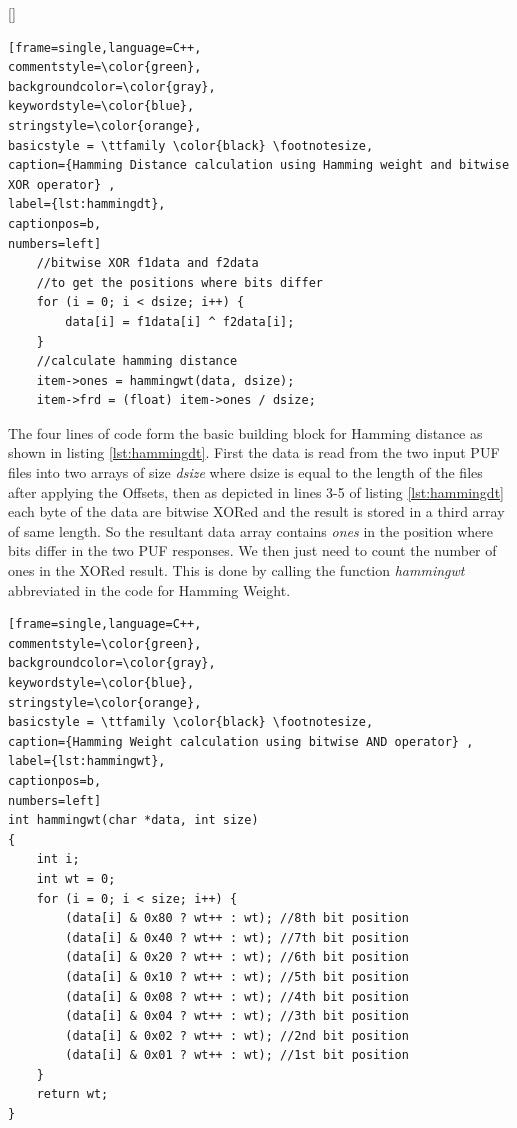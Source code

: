 \begin{center}[]
\begin{minipage}{0.7\textwidth}
\begin{lstlisting}[frame=single,language=C++,
commentstyle=\color{green},
backgroundcolor=\color{gray},
keywordstyle=\color{blue},
stringstyle=\color{orange},
basicstyle = \ttfamily \color{black} \footnotesize,
caption={Hamming Distance calculation using Hamming weight and bitwise XOR operator} ,
label={lst:hammingdt},
captionpos=b,
numbers=left]
    //bitwise XOR f1data and f2data
    //to get the positions where bits differ
    for (i = 0; i < dsize; i++) {
        data[i] = f1data[i] ^ f2data[i];
    }
    //calculate hamming distance
    item->ones = hammingwt(data, dsize);
    item->frd = (float) item->ones / dsize;
\end{lstlisting}
\end{minipage}
\end{center}

The four lines of code form the basic building block for Hamming distance as shown in listing \ref{lst:hammingdt}. First the data is read from the two input PUF files into two arrays of size \emph{dsize} where dsize is equal to the length of the files after applying the Offsets, then as depicted in lines 3-5 of listing \ref{lst:hammingdt} each byte of the data are bitwise XORed and the result is stored in a third array of same length. So the resultant data array contains
\emph{ones} in the position where bits differ in the two PUF responses. We then just need to count the number of ones in the XORed result.
This is done by calling the function \emph{hammingwt} abbreviated in the code for Hamming Weight.\\

\begin{center}
\begin{minipage}{0.7\textwidth}
\begin{lstlisting}[frame=single,language=C++,
commentstyle=\color{green},
backgroundcolor=\color{gray},
keywordstyle=\color{blue},
stringstyle=\color{orange},
basicstyle = \ttfamily \color{black} \footnotesize,
caption={Hamming Weight calculation using bitwise AND operator} ,
label={lst:hammingwt},
captionpos=b,
numbers=left]
int hammingwt(char *data, int size)
{
    int i;
    int wt = 0;
    for (i = 0; i < size; i++) {
        (data[i] & 0x80 ? wt++ : wt); //8th bit position
        (data[i] & 0x40 ? wt++ : wt); //7th bit position
        (data[i] & 0x20 ? wt++ : wt); //6th bit position
        (data[i] & 0x10 ? wt++ : wt); //5th bit position
        (data[i] & 0x08 ? wt++ : wt); //4th bit position
        (data[i] & 0x04 ? wt++ : wt); //3th bit position
        (data[i] & 0x02 ? wt++ : wt); //2nd bit position
        (data[i] & 0x01 ? wt++ : wt); //1st bit position
    }
    return wt;
}
\end{lstlisting}
\end{minipage}
\end{center}

